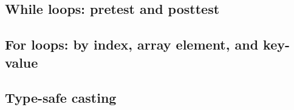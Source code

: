 \documentclass{article}
\theoremstyle{definition}
\begin{document}

\hypertarget{hsec:whileloops}{}
\subsection{While loops: pretest and posttest}
\label{sec:whileloops}


\hypertarget{hsec:forloops}{}
\subsection{For loops: by index, array element, and key-value}
\label{sec:forloops}


\hypertarget{hsec:casting}{}
\subsection{Type-safe casting}
\label{sec:casting}

\end{document}
